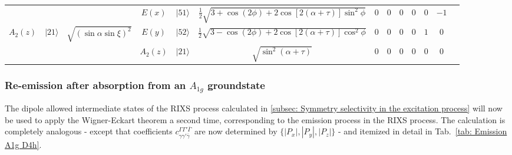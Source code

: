 \documentclass[twocolumn,prb,twocolumn,amsmath,superscriptaddress,nofootinbib,amssymb]{revtex4-1}
\begin{document}
\begin{widetext}
\begin{table*}[htbp]
{\begin{tabular}{cc|c||cc|c||ccccccc}
\hline
  & & &  $E(x)$ &   $|51\rangle$&  $\frac{1}{2}\sqrt{3+\cos(2\phi)+2\cos\left[2(\alpha+\tau)\right]\sin^2\phi}$ &    0 &     0&     0 &          0 &          0 &          $-1$ &          \\

  $A_2(z)$& $|21\rangle$   &$\sqrt{(\sin\alpha\sin\xi)^2}$&        $E(y)$ &    $|52\rangle$& $\frac{1}{2}\sqrt{3-\cos(2\phi)+2\cos\left[2(\alpha+\tau)\right]\cos^2\phi}$   &  0 &    0&      0 &          0 &          $1$ &          0 &           \\

        &  &&   $A_2(z)$ &    $|21\rangle$& $\sqrt{\sin^2(\alpha+\tau)}$ &    0 &      0&    0 &          0 &          0 &          0 &          \\


\hline
\end{tabular}}
\caption{\label{tab: Emission A1g D4h} Symmetry selectivity in the re-emission process after absorption from a spherical ground state $A_{1g}$ in $D_{4h}$ symmetry. Note that parity is omitted. The table consists of three major parts. The left part, here marked by $|i\rangle$, marks the initial state of the transition. The column indicated by ``$\times$'' gives the relative weight of initial state $\Gamma'\gamma'$. The middle part, here indicated by $T_2$, gives the relevant transitions $\overline{\Gamma}\overline{\gamma}$ and their relative weight indicated by ``$\times$''. The right part summarizes all coupling coefficients between initial state and transition operator. To find the spectral weight of a certain final state $|\Gamma'',\gamma''\rangle$, one has to sum over all non zero components of the associated column multiplied by the weights ``$\times$'' of the same row. For final state $|5,2\rangle$ this would be e.g. $\left(-\frac{1}{2}\sqrt{3+\cos(2\phi)+2\cos\left[2(\alpha+\tau)\right]\sin^2\phi}\sqrt{(\sin\alpha\sin\xi)^2}\right)^2$.}
\end{table*}


\subsubsection{Re-emission after absorption from an $A_{1g}$ groundstate}


The dipole allowed intermediate states of the RIXS process calculated in \ref{subsec: Symmetry selectivity in the excitation process} will now be used to apply the Wigner-Eckart theorem a second time, corresponding to the emission process in the RIXS process. The calculation is completely analogous - except that coefficients $c^{\Gamma\Gamma'\overline{\Gamma}}_{\gamma\gamma'\overline{\gamma}}$ are now determined by $\{|P_x|,|P_y|,|P_z|\}$ - and itemized in detail in Tab.~\ref{tab: Emission A1g D4h}.


\end{widetext}
\end{document}
